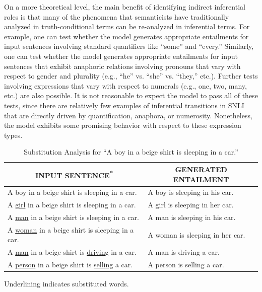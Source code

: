 \documentclass[utf8]{frontiersSCNS} %
\begin{document}
On a more theoretical level, the main benefit of identifying indirect inferential roles is that many of the phenomena that semanticists have traditionally analyzed in truth-conditional terms can be re-analyzed in inferential terms. For example, one can test whether the model generates appropriate entailments for input sentences involving standard quantifiers like ``some'' and ``every.'' Similarly, one can test whether the model generates appropriate entailments for input sentences that exhibit anaphoric relations involving pronouns that vary with respect to gender and plurality (e.g., ``he'' vs. ``she'' vs. ``they,'' etc.). Further tests involving expressions that vary with respect to numerals (e.g., one, two, many, etc.) are also possible. It is not reasonable to expect the model to pass all of these tests, since there are relatively few examples of inferential transitions in SNLI that are directly driven by quantification, anaphora, or numerosity. Nonetheless, the model exhibits some promising behavior with respect to these expression types.

\begin{table}[!t]
\begin{center} 
\begin{threeparttable}

\caption{Substitution Analysis for ``A boy in a beige shirt is sleeping in a car.''}
\label{tab:sub}
\vskip 0.06in
\setlength{\tabcolsep}{12pt}

\begin{tabular}{ll} 
\hline

\multicolumn{1}{c}{\rule{0pt}{3ex} INPUT SENTENCE\textsuperscript{*}} & 
\multicolumn{1}{c}{GENERATED ENTAILMENT} \\

\hline
\rule{0pt}{3ex}A boy in a beige shirt is sleeping in a car. & A boy is sleeping in his car. \\
A \underline{girl} in a beige shirt is sleeping in a car. & A girl is sleeping in her car. \\
A \underline{man} in a beige shirt is sleeping in a car. & A man is sleeping in his car. \\
A \underline{woman} in a beige shirt is sleeping in a car. & A woman is sleeping in her car. \\
A \underline{man} in a beige shirt is \underline{driving} in a car. & A man is driving a car. \\
A \underline{person} in a beige shirt is \underline{selling} a car. & A person is selling a car. \\
\hline
\end{tabular}

\begin{tablenotes}
      \footnotesize
      \item\centering * Underlining indicates substituted words.
\end{tablenotes}

\end{threeparttable}
\end{center} 

\end{table}
\end{document}
